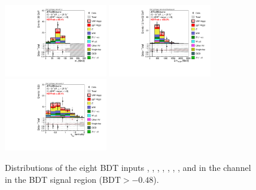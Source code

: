 \begin{figure}[p!]
   \includegraphics[width=0.4\textwidth]{fig/analysis/BDTinputVarsInSR/DF_SR_FitRegion_MT_tr_mh125_lin.pdf}
   \includegraphics[width=0.4\textwidth]{fig/analysis/BDTinputVarsInSR/DF_SR_FitRegion_SumOFMvaMLepxJety_mh125_lin.pdf}
   \includegraphics[width=0.4\textwidth]{fig/analysis/BDTinputVarsInSR/DF_SR_FitRegion_contOLV_mh125_lin.pdf}
   \caption{Distributions
   of the eight BDT inputs \dphill, \mll, \dyjj, \mjj, \pTtot, \mT, \SumMlj, and
   \lepEtaCent
   in the \emme channel in the BDT signal region ($\textrm{BDT} > -0.48$).}
  \label{chap:analysis:fig:bdt_inputs_sr_df}
\end{figure}

